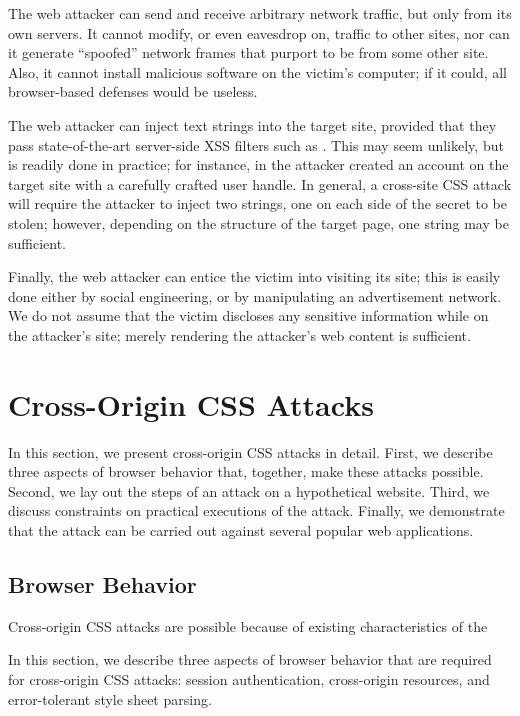 \documentclass{acm_proc_article-sp}
\begin{document}
The web attacker can send and receive arbitrary network traffic, but
only from its own servers.  It cannot modify, or even eavesdrop on,
traffic to other sites, nor can it generate “spoofed” network frames
that purport to be from some other site.  Also, it cannot install
malicious software on the victim's computer; if it could, all
browser-based defenses would be useless.

The web attacker can inject text strings into the target site,
provided that they pass state-of-the-art server-side XSS filters such
as .  This may seem unlikely, but is readily
done in practice; for instance, in \cite{cssxss08} the attacker
created an account on the target site with a carefully crafted user
handle.  In general, a cross-site CSS attack will require the attacker
to inject two strings, one on each side of the secret to be stolen;
however, depending on the structure of the target page, one string may
be sufficient.

Finally, the web attacker can entice the victim into visiting its
site; this is easily done either by social engineering, or by
manipulating an advertisement network.  We do not assume that the
victim discloses any sensitive information while on the attacker's
site; merely rendering the attacker's web content is sufficient.

\section{Cross-Origin CSS Attacks} \label{sec:attacks}

In this section, we present cross-origin CSS attacks in detail.
First, we describe three aspects of browser behavior that, together,
make these attacks possible.  Second, we lay out the steps of an
attack on a hypothetical website.  Third, we discuss constraints on
practical executions of the attack.  Finally, we demonstrate that the
attack can be carried out against several popular web applications.

\subsection{Browser Behavior}

Cross-origin CSS attacks are possible because of existing
characteristics of the 

In this section, we describe three aspects of browser behavior that are required for cross-origin CSS attacks: session authentication, cross-origin resources, and error-tolerant style sheet parsing.
\end{document}
